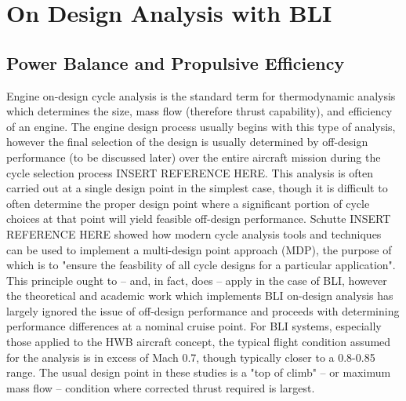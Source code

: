 \documentclass[12pt]{gatech-thesis}
\begin{document}
\section{On Design Analysis with BLI}

\subsection{Power Balance and Propulsive Efficiency}
Engine on-design cycle analysis is the standard term for thermodynamic analysis which determines the size, mass flow (therefore thrust capability), and efficiency of an engine.  The engine design process usually begins with this type of analysis, however the final selection of the design is usually determined by off-design performance (to be discussed later) over the entire aircraft mission during the cycle selection process INSERT REFERENCE HERE.  This analysis is often carried out at a single design point in the simplest case, though it is difficult to often determine the proper design point where a significant portion of cycle choices at that point will yield feasible off-design performance.  Schutte INSERT REFERENCE HERE showed how modern cycle analysis tools and techniques can be used to implement a multi-design point approach (MDP), the purpose of which is to "ensure the feasbility of all cycle designs for a particular application".  This principle ought to -- and, in fact, does -- apply in the case of BLI, however the theoretical and academic work which implements BLI on-design analysis has largely ignored the issue of off-design performance and proceeds with determining performance differences at a nominal cruise point.  For BLI systems, especially those applied to the HWB aircraft concept, the typical flight condition assumed for the analysis is in excess of Mach 0.7, though typically closer to a 0.8-0.85 range.  The usual design point in these studies is a "top of climb" -- or maximum mass flow -- condition where corrected thrust required is largest.
\end{document}
